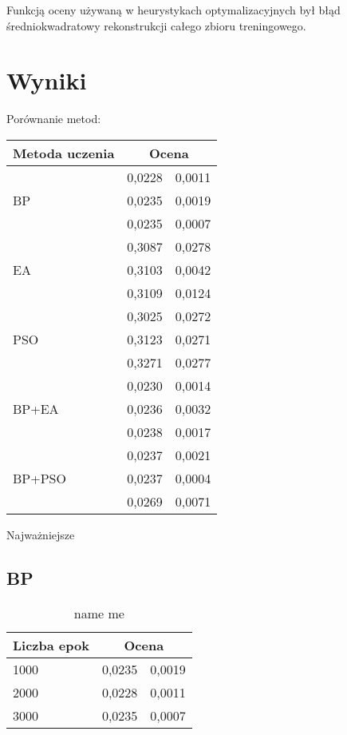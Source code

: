 \documentclass[11pt,a4paper,oneside]{report}
\begin{document}
Funkcją oceny używaną w heurystykach optymalizacyjnych był błąd średniokwadratowy rekonstrukcji całego zbioru treningowego.

\section{Wyniki}

Porównanie metod:

\begin{table}
	\caption{name me}
	\centering 
	\begin{longtable}{|l|r@{$\pm$}r|}
		\hline
		Metoda uczenia & \multicolumn{2}{|c|}{Ocena} \\
		\hline \hline
		\multirow{3}{*}{BP} & 0,0228 & 0,0011 \\ 
		 & 0,0235 & 0,0019 \\ 
		 & 0,0235 & 0,0007 \\ \hline
		\multirow{3}{*}{EA} & 0,3087 & 0,0278 \\ 
		 & 0,3103 & 0,0042 \\ 
		 & 0,3109 & 0,0124 \\ \hline
		\multirow{3}{*}{PSO} & 0,3025 & 0,0272 \\ 
		 & 0,3123 & 0,0271 \\ 
		 & 0,3271 & 0,0277 \\ \hline
		\multirow{3}{*}{BP+EA} & 0,0230 & 0,0014 \\
		 & 0,0236 & 0,0032 \\
		 & 0,0238 & 0,0017 \\ \hline
		\multirow{3}{*}{BP+PSO} & 0,0237 & 0,0021 \\
		 & 0,0237 & 0,0004 \\
		 & 0,0269 & 0,0071 \\ \hline
	\end{longtable}
\end{table}

\begin{figure}
	
\end{figure}

Najważniejsze

\subsection{BP}

\begin{center}
	\begin{longtable}{|l|r@{$\pm$}r|}
		\caption{name me}\\
		\hline
		Liczba epok & \multicolumn{2}{|c|}{Ocena}\\ \hline \hline\endhead
		1000 & 0,0235 & 0,0019 \\ \hline
		2000 & 0,0228 & 0,0011\\ \hline
		3000 & 0,0235 & 0,0007\\ \hline
	\end{longtable}
\end{center}
\end{document}

